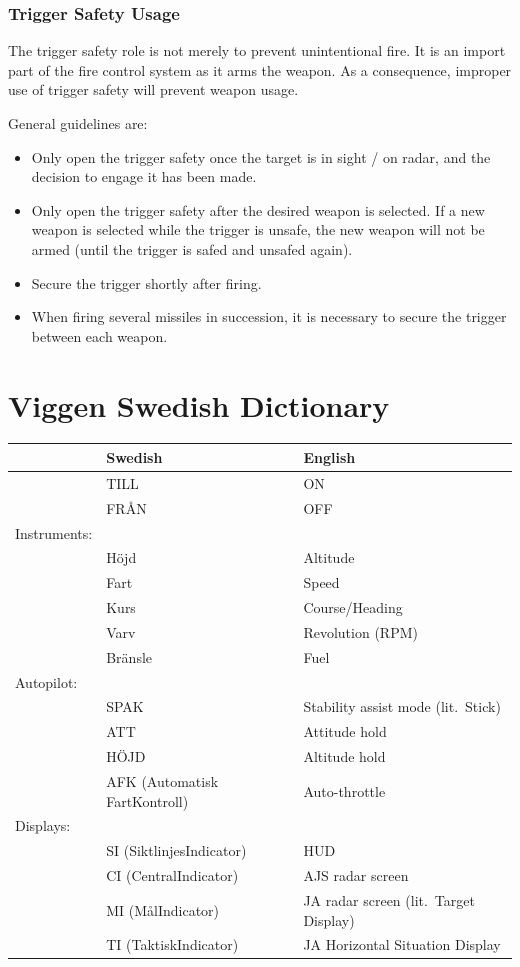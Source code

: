 \documentclass[a4paper]{report}
\begin{document}
\subsection{Trigger Safety Usage}
The trigger safety role is not merely to prevent unintentional fire.
It is an import part of the fire control system as it arms the weapon.
As a consequence, improper use of trigger safety will prevent weapon usage.

General guidelines are:
\begin{itemize}
  \item Only open the trigger safety once the target is in sight / on radar,
    and the decision to engage it has been made.
  \item Only open the trigger safety after the desired weapon is selected.
    If a new weapon is selected while the trigger is unsafe, the new weapon
    will not be armed (until the trigger is safed and unsafed again).
  \item Secure the trigger shortly after firing.
  \item When firing several missiles in succession,
    it is necessary to secure the trigger between each weapon.
\end{itemize}


\appendix
\chapter{Viggen Swedish Dictionary}
\begin{tabular}{ll@{\hspace{1em}}l}
  & Swedish & English \\
  \hline
  & TILL & ON \\
  & FRÅN & OFF \\
  Instruments:\\
  & Höjd & Altitude \\
  & Fart & Speed \\
  & Kurs & Course/Heading \\
  & Varv & Revolution (RPM) \\
  & Bränsle & Fuel \\
  Autopilot: \\
  & SPAK & Stability assist mode (lit.\ Stick) \\
  & ATT & Attitude hold \\
  & HÖJD & Altitude hold \\
  & AFK (Automatisk FartKontroll) & Auto-throttle \\
  Displays: \\
  & SI (SiktlinjesIndicator) & HUD \\
  & CI (CentralIndicator) & AJS radar screen \\
  & MI (MålIndicator) & JA radar screen (lit.\ Target Display) \\
  & TI (TaktiskIndicator) & JA Horizontal Situation Display \\
\end{tabular}
\end{document}
